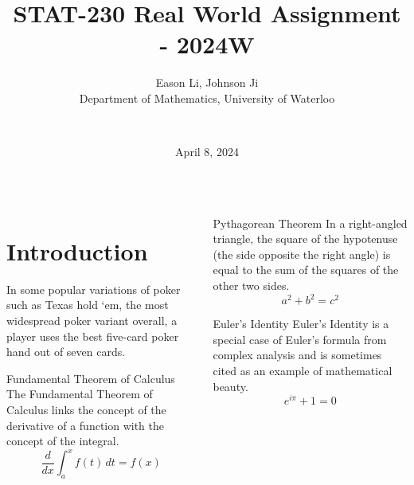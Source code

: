 \documentclass[final]{beamer}
\title{STAT-230 Real World Assignment - 2024W}
\author{
    Eason Li, Johnson Ji \\
    Department of Mathematics, University of Waterloo \and \\
}
\date{April 8, 2024} %
\begin{document}
\maketitle


\begin{frame}[t]
\begin{columns}[t]

    \begin{column}{.48\linewidth}


    \section*{Introduction}
        In some popular variations of poker such as Texas hold `em, 
        the most widespread poker variant overall, a player uses the best five-card poker hand out of seven cards.

    \begin{block}{Fundamental Theorem of Calculus}
    The Fundamental Theorem of Calculus links the concept of the derivative of a function with the concept of the integral.
    \[
    \frac{d}{dx} \int_a^x f(t)\, dt = f(x)
    \]
    \end{block}
    \end{column}

    \begin{column}{.48\linewidth}
    \begin{block}{Pythagorean Theorem}
    In a right-angled triangle, the square of the hypotenuse (the side opposite the right angle) is equal to the sum of the squares of the other two sides.
    \[
    a^2 + b^2 = c^2
    \]
    \end{block}

    \begin{block}{Euler's Identity}
    Euler's Identity is a special case of Euler's formula from complex analysis and is sometimes cited as an example of mathematical beauty.
    \[
    e^{i\pi} + 1 = 0
    \]
    \end{block}
    \end{column}


\end{columns}
\end{frame}
\end{document}
